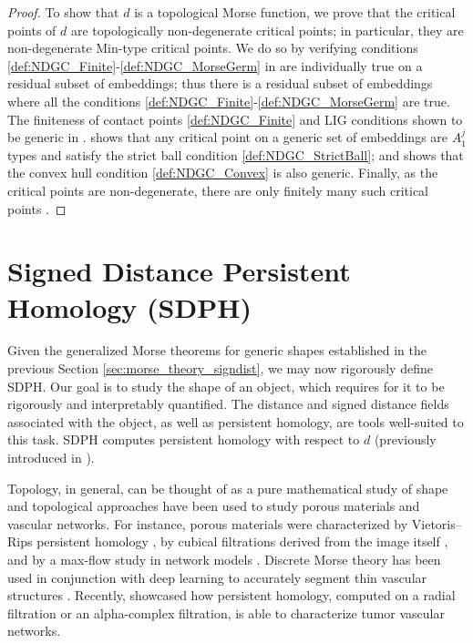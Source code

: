 \documentclass[11pt]{article}
\theoremstyle{plain}
\theoremstyle{definition}
\theoremstyle{remark}
\begin{document}
	\begin{proof}
		To show that $d$ is a topological Morse function, we prove that the critical points of $d$ are topologically non-degenerate critical points; in particular, they are non-degenerate Min-type critical points. We do so by verifying conditions \ref{def:NDGC_Finite}-\ref{def:NDGC_MorseGerm} in  are individually true on a residual subset of embeddings; thus there is a residual subset of embeddings where all the conditions \ref{def:NDGC_Finite}-\ref{def:NDGC_MorseGerm} are true. The finiteness of contact points \ref{def:NDGC_Finite} and LIG  conditions shown to be generic in .  shows that any critical point on a generic set of embeddings are $A_1^j$ types and satisfy the strict ball condition \ref{def:NDGC_StrictBall}; and  shows that the convex hull condition \ref{def:NDGC_Convex} is also generic. Finally, as the critical points are non-degenerate, there are only finitely many such critical points . 
	\end{proof}
	
	\section{Signed Distance Persistent Homology (SDPH)}
	\label{sec:SDPH}
	
	Given the generalized Morse theorems for generic shapes established in the previous Section \ref{sec:morse_theory_signdist}, we may now rigorously define SDPH. Our goal is to study the shape of an object, which requires for it to be rigorously and interpretably quantified. The distance and signed distance fields associated with the object, as well as persistent homology, are tools well-suited to this task. SDPH computes persistent homology with respect to $d$ (previously introduced in ).
	
	Topology, in general, can be thought of as a pure mathematical study of shape and topological approaches have been used to study porous materials and vascular networks. For instance, porous materials were characterized by Vietoris--Rips persistent homology \citep{lee_quantifying_2017, obayashi_persistent_2022}, by cubical filtrations derived from the image itself \citep{robins_theory_2011}, and by a max-flow study in network models \citep{armstrong_correspondence_2021}. Discrete Morse theory has been used in conjunction with deep learning to accurately segment thin vascular structures \citep{hu_topology-preserving_2019,hu_learning_2022}.
	Recently, \cite{stolz_multiscale_2022} showcased how persistent homology, computed on a radial filtration or an alpha-complex filtration, is able to characterize tumor vascular networks.
	
\end{document}
